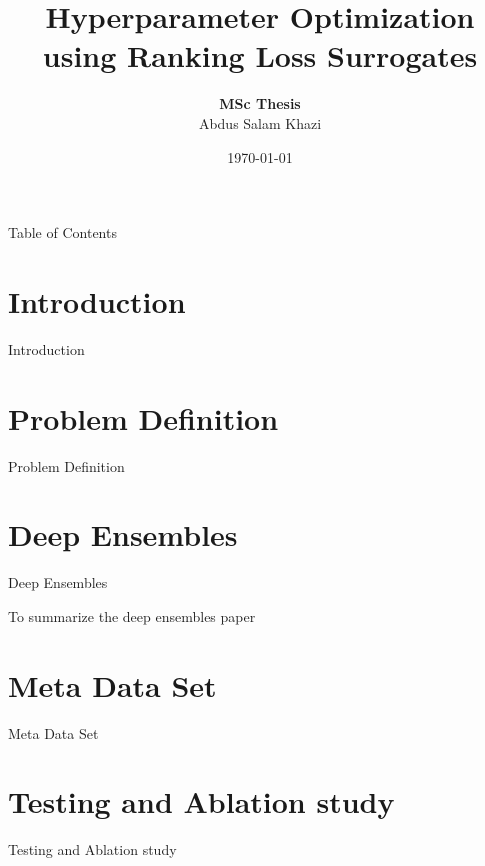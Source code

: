 \documentclass{beamer}
\title[HPO using RL Surrogates]{Hyperparameter Optimization using Ranking Loss Surrogates}
\author[Abdus Salam Khazi]
{
    \textbf{MSc Thesis}\\
    Abdus Salam Khazi
}
\institute{Supervisors: \\
            \begin{tabular}{ll}
		    	JProf. Josif Grabocka \& Sebastian Pineda
		    \end{tabular}
}
\date{\today}
\begin{document}
\begin{frame}
\titlepage
\end{frame}

\begin{frame}{Table of Contents}
\tableofcontents
\end{frame}

\section{Introduction}

\begin{frame}[t]{Introduction}

\end{frame}

\section{Problem Definition}

\begin{frame}[t]{Problem Definition}

\end{frame}

\section{Deep Ensembles}

\begin{frame}[t]{Deep Ensembles}

To summarize the deep ensembles paper \cite{DeepEnsemblesPaper}

\end{frame}

\section{Meta Data Set}

\begin{frame}[t]{Meta Data Set}

\end{frame}


\section{Testing and Ablation study}

\begin{frame}[t]{Testing and Ablation study}

\end{frame}
\end{document}
